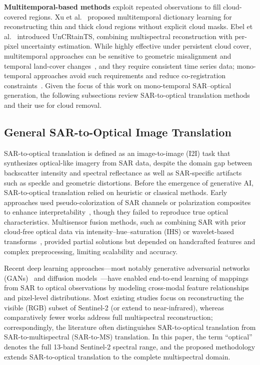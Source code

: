\documentclass[remotesensing,article,submit,pdftex,moreauthors]{Definitions/mdpi}
\begin{document}
\textbf{Multitemporal-based methods} exploit repeated observations to fill cloud-covered regions. Xu et al.~\cite{CR_spars_repre_MT_dict_L} proposed multitemporal dictionary learning for reconstructing thin and thick cloud regions without explicit cloud masks. Ebel et al.~\cite{UnCRtainTS} introduced UnCRtainTS, combining multispectral reconstruction with per-pixel uncertainty estimation. While highly effective under persistent cloud cover, multitemporal approaches can be sensitive to geometric misalignment and temporal land-cover changes~\cite{expl_ML_CR_Cameroon}, and they require consistent time series data; mono-temporal approaches avoid such requirements and reduce co-registration constraints~\cite{kiwa_auto_Delineation_BAs}. Given the focus of this work on mono-temporal SAR--optical generation, the following subsections review SAR-to-optical translation methods and their use for cloud removal.

\subsection{General SAR-to-Optical Image Translation}
SAR-to-optical translation is defined as an image-to-image (I2I) task that synthesizes optical-like imagery from SAR data, despite the domain gap between backscatter intensity and spectral reflectance as well as SAR-specific artifacts such as speckle and geometric distortions. Before the emergence of generative AI, SAR-to-optical translation relied on heuristic or classical methods. Early approaches used pseudo-colorization of SAR channels or polarization composites to enhance interpretability~\cite{colorization_Schmitt_2018}, though they failed to reproduce true optical characteristics. Multisensor fusion methods, such as combining SAR with prior cloud-free optical data via intensity–hue–saturation (IHS) or wavelet-based transforms~\cite{IHS_wavelet_Zhang2019}, provided partial solutions but depended on handcrafted features and complex preprocessing, limiting scalability and accuracy.

Recent deep learning approaches—most notably generative adversarial networks (GANs)~\cite{GANs_Goodfellow} and diffusion models~\cite{DDPM_2020}—have enabled end-to-end learning of mappings from SAR to optical observations by modeling cross-modal feature relationships and pixel-level distributions. Most existing studies focus on reconstructing the visible (RGB) subset of Sentinel-2 (or extend to near-infrared), whereas comparatively fewer works address full multispectral reconstruction; correspondingly, the literature often distinguishes SAR-to-optical translation from SAR-to-multispectral (SAR-to-MS) translation. In this paper, the term ``optical'' denotes the full 13-band Sentinel-2 spectral range, and the proposed methodology extends SAR-to-optical translation to the complete multispectral domain.
\end{document}
